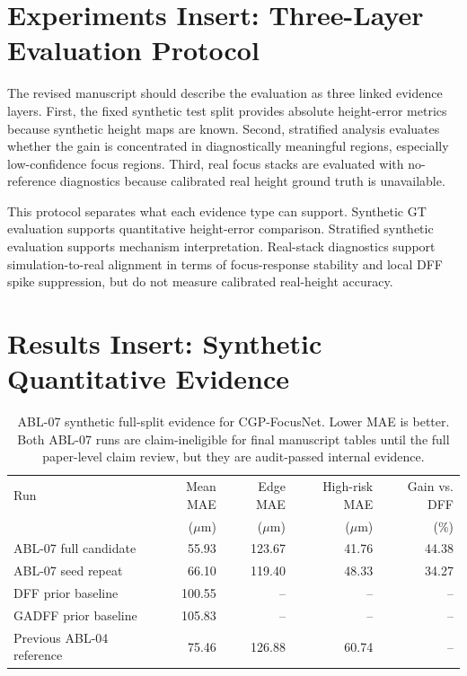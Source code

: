 \documentclass[11pt,a4paper]{article}
\newcommand{\method}{CGP-FocusNet}
\newcommand{\um}{\ensuremath{\mu\mathrm{m}}}
\begin{document}
\section*{Experiments Insert: Three-Layer Evaluation Protocol}

The revised manuscript should describe the evaluation as three linked evidence layers. First, the fixed synthetic test split provides absolute height-error metrics because synthetic height maps are known. Second, stratified analysis evaluates whether the gain is concentrated in diagnostically meaningful regions, especially low-confidence focus regions. Third, real focus stacks are evaluated with no-reference diagnostics because calibrated real height ground truth is unavailable.

This protocol separates what each evidence type can support. Synthetic GT evaluation supports quantitative height-error comparison. Stratified synthetic evaluation supports mechanism interpretation. Real-stack diagnostics support simulation-to-real alignment in terms of focus-response stability and local DFF spike suppression, but do not measure calibrated real-height accuracy.

\section*{Results Insert: Synthetic Quantitative Evidence}

\begin{table}[h]
  \centering
  \caption{ABL-07 synthetic full-split evidence for \method. Lower MAE is better. Both ABL-07 runs are claim-ineligible for final manuscript tables until the full paper-level claim review, but they are audit-passed internal evidence.}
  \label{tab:cgp_synthetic}
  \small
  \begin{tabular}{lrrrr}
    \toprule
    Run & Mean MAE & Edge MAE & High-risk MAE & Gain vs. DFF \\
    & (\um{}) & (\um{}) & (\um{}) & (\%) \\
    \midrule
    ABL-07 full candidate & 55.93 & 123.67 & 41.76 & 44.38 \\
    ABL-07 seed repeat & 66.10 & 119.40 & 48.33 & 34.27 \\
    DFF prior baseline & 100.55 & -- & -- & -- \\
    GADFF prior baseline & 105.83 & -- & -- & -- \\
    Previous ABL-04 reference & 75.46 & 126.88 & 60.74 & -- \\
    \bottomrule
  \end{tabular}
\end{table}
\end{document}
